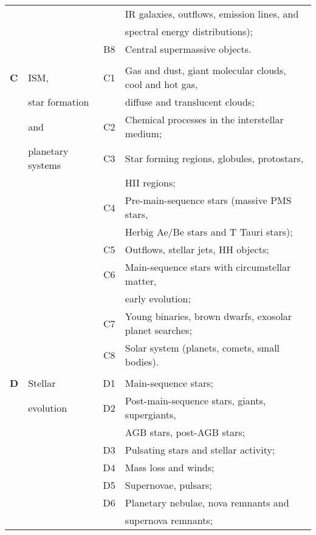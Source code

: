 \documentclass{article}
\begin{document}
\begin{table}[p]
{\begin{center}
\begin{tabular}{llcl}
       &           &    &  IR galaxies, outflows, emission lines, and \\
       &           &    &  spectral energy distributions); \\  
       &           & B8 & Central supermassive objects. \\[4pt]
\hline
& & & \\[-6pt]
{\bf C}& ISM, & C1 & Gas and dust, giant molecular clouds, cool and hot gas,\\
       & star formation &   &  diffuse and translucent clouds; \\ 
       & and            &C2& Chemical processes in the interstellar medium; \\
       & planetary systems &C3& Star forming regions, globules, protostars, \\
       &      &    &  HII regions; \\
       &      & C4 & Pre-main-sequence stars (massive PMS stars, \\
       &      &    &  Herbig Ae/Be stars and T Tauri stars); \\  
       &      & C5 & Outflows, stellar jets, HH objects; \\
       &      & C6 & Main-sequence stars with circumstellar matter, \\
       &      &    &  early evolution;   \\
       &      & C7 & Young binaries, brown dwarfs, exosolar planet searches;\\ 
       &      & C8 & Solar system (planets, comets, small bodies). \\[4pt]  
\hline
& & & \\[-6pt]
{\bf D}& Stellar   & D1 & Main-sequence stars; \\
       & evolution & D2 & Post-main-sequence stars, giants, supergiants, \\
       &           &    &  AGB stars, post-AGB stars; \\
       &           & D3 & Pulsating stars and stellar activity; \\
       &           & D4 & Mass loss and winds; \\
       &           & D5 & Supernovae, pulsars; \\
       &           & D6 & Planetary nebulae, nova remnants and \\
       &           &    &  supernova remnants; \\

\end{tabular}
\end{center}}
\end{table}
\end{document}

